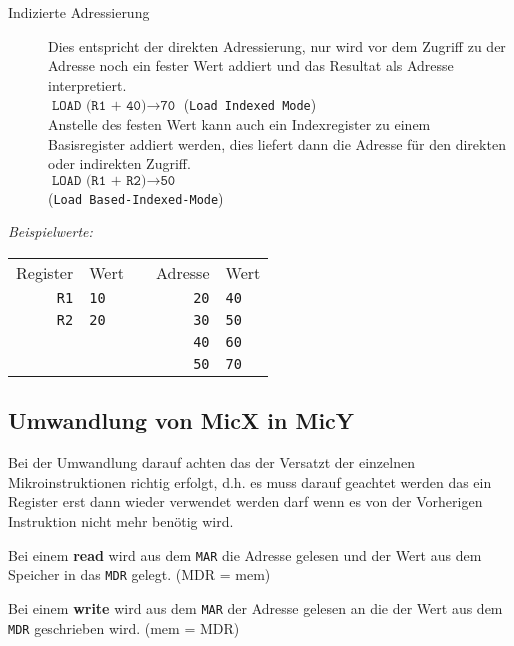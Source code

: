 \documentclass
[
	8pt,		%
	ngerman,	%
	a4paper,	%
	landscape,	%
	final		%
]{extarticle}
\begin{document}
\begin{multicols*}{4}
\begin{description}
	\item[Indizierte Adressierung]
	      Dies entspricht der direkten Adressierung, nur wird vor dem
	      Zugriff zu der Adresse noch ein fester Wert addiert und das
	      Resultat als Adresse interpretiert. \\
	      $\texttt{LOAD (R1 + 40)}\rightarrow\texttt{70}$ (\texttt{Load Indexed Mode}) \\
	      Anstelle des festen Wert kann auch ein Indexregister zu einem
	      Basisregister addiert werden, dies liefert dann die Adresse für
	      den direkten oder indirekten Zugriff. \\
	      $\texttt{LOAD (R1 + R2)}\rightarrow\texttt{50}$ \\(\texttt{Load Based-Indexed-Mode})
\end{description}
\emph{Beispielwerte:}
\begin{center}
	\begin{tabular}{|r|l|c|r|l|}\cline{1-2}\cline{4-5}
		Register    & Wert        &  & Adresse     & Wert        \\\cline{1-2}\cline{4-5}
		\texttt{R1} & \texttt{10} &  & \texttt{20} & \texttt{40} \\\cline{1-2}\cline{4-5}
		\texttt{R2} & \texttt{20} &  & \texttt{30} & \texttt{50} \\\cline{1-2}\cline{4-5}
		            &             &  & \texttt{40} & \texttt{60} \\\cline{1-2}\cline{4-5}
		            &             &  & \texttt{50} & \texttt{70} \\\cline{1-2}\cline{4-5}
	\end{tabular}
\end{center}
\subsection{Umwandlung von MicX in MicY}
Bei der Umwandlung darauf achten das der Versatzt der einzelnen Mikroinstruktionen
richtig erfolgt, d.h. es muss darauf geachtet werden das ein Register erst dann wieder
verwendet werden darf wenn es von der Vorherigen Instruktion nicht mehr benötig wird. \par
Bei einem \textbf{read} wird aus dem \texttt{MAR} die Adresse gelesen und der Wert aus
dem Speicher in das \texttt{MDR} gelegt. (\textsf{MDR = mem}) \par
Bei einem \textbf{write} wird aus dem \texttt{MAR} der Adresse gelesen an die der Wert
aus dem \texttt{MDR} geschrieben wird. (\textsf{mem = MDR})


\end{multicols*}
\end{document}
